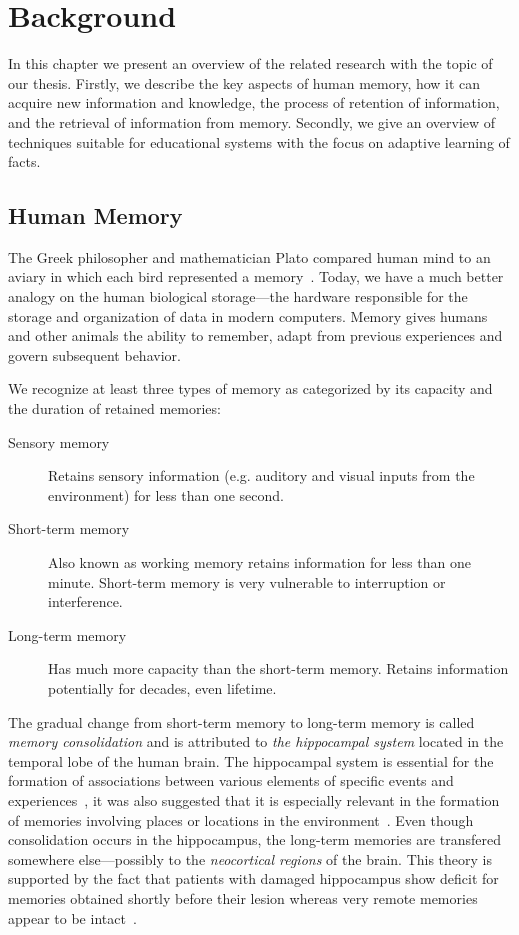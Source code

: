 \chapter{Background}

In this chapter we present an overview of the related research with the topic of our thesis. Firstly, we describe the key aspects of human memory, how it can acquire new information and knowledge, the process of retention of information, and the retrieval of information from memory. Secondly, we give an overview of techniques suitable for educational systems with the focus on adaptive learning of facts.

\section{Human Memory}

The Greek philosopher and mathematician Plato compared human mind to an aviary in which each bird represented a memory~\cite{MichaelW.Eysenck2008}. Today, we have a much better analogy on the human biological storage---the hardware responsible for the storage and organization of data in modern computers. Memory gives humans and other animals the ability to remember, adapt from previous experiences and govern subsequent behavior.

We recognize at least three types of memory as categorized by its capacity and the duration of retained memories:

\begin{description}
  \item [Sensory memory] Retains sensory information (e.g. auditory and visual inputs from the environment) for less than one second.
  \item [Short-term memory] Also known as working memory retains information for less than one minute. Short-term memory is very vulnerable to interruption or interference.
  \item [Long-term memory] Has much more capacity than the short-term memory. Retains information potentially for decades, even lifetime.
\end{description}

The gradual change from short-term memory to long-term memory is called \textit{memory consolidation} and is attributed to \textit{the hippocampal system} located in the temporal lobe of the human brain. The hippocampal system is essential for the formation of associations between various elements of specific events and experiences~\cite{mcclelland1995there}, it was also suggested that it is especially relevant in the formation of memories involving places or locations in the environment~\cite{o1978hippocampus}. Even though consolidation occurs in the hippocampus, the long-term memories are transfered somewhere else---possibly to the \textit{neocortical regions} of the brain. This theory is supported by the fact that patients with damaged hippocampus show deficit for memories obtained shortly before their lesion whereas very remote memories appear to be intact~\cite{mcclelland1995there}.

